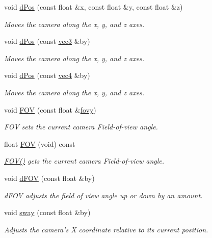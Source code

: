 \begin{DoxyCompactItemize}
void \hyperlink{class_camera_a2ac5f89b4f9f012dead66980925143c0}{d\-Pos} (const float \&x, const float \&y, const float \&z)
\begin{DoxyCompactList}\small\item\em \-Moves the camera along the x, y, and z axes. \end{DoxyCompactList}\item 
void \hyperlink{class_camera_a928de59670f0b31264307a8a0888b99d}{d\-Pos} (const \hyperlink{struct_angel_1_1vec3}{vec3} \&by)
\begin{DoxyCompactList}\small\item\em \-Moves the camera along the x, y, and z axes. \end{DoxyCompactList}\item 
void \hyperlink{class_camera_a4ec2e3d2a66826aedb1ac1eee7da0b96}{d\-Pos} (const \hyperlink{struct_angel_1_1vec4}{vec4} \&by)
\begin{DoxyCompactList}\small\item\em \-Moves the camera along the x, y, and z axes. \end{DoxyCompactList}\item 
void \hyperlink{class_camera_ac325bf616014d2e6023b84b6224630ac}{\-F\-O\-V} (const float \&\hyperlink{class_camera_acc8b97facc57059530efad534c2f8314}{fovy})
\begin{DoxyCompactList}\small\item\em \-F\-O\-V sets the current camera \-Field-\/of-\/view angle. \end{DoxyCompactList}\item 
float \hyperlink{class_camera_a8817ea073431268d8c0e522cdc30026c}{\-F\-O\-V} (void) const 
\begin{DoxyCompactList}\small\item\em \hyperlink{class_camera_a8817ea073431268d8c0e522cdc30026c}{\-F\-O\-V()} gets the current camera \-Field-\/of-\/view angle. \end{DoxyCompactList}\item 
void \hyperlink{class_camera_a55355b3376d195b17adcc6a5b72ae07b}{d\-F\-O\-V} (const float \&by)
\begin{DoxyCompactList}\small\item\em d\-F\-O\-V adjusts the field of view angle up or down by an amount. \end{DoxyCompactList}\item 
void \hyperlink{class_camera_abbe6fe82ed05e64e35b0c4ed2001b34e}{sway} (const float \&by)
\begin{DoxyCompactList}\small\item\em \-Adjusts the camera's \-X coordinate relative to its current position. \end{DoxyCompactList}\item 

\end{DoxyCompactItemize}

